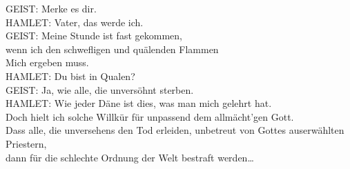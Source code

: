 {\begin{playdialog}
GEIST: Merke es dir.\\

HAMLET: Vater, das werde ich.\\

GEIST: Meine Stunde ist fast gekommen,\\
wenn ich den schwefligen und quälenden Flammen\\
Mich ergeben muss.\\

HAMLET: Du bist in Qualen?\\

GEIST: Ja, wie alle, die unversöhnt sterben.\\


HAMLET: Wie jeder Däne ist dies, was man mich gelehrt hat.\\
Doch hielt ich solche Willkür für unpassend dem allmächt'gen Gott.\\
Dass alle, die unversehens den Tod erleiden, unbetreut von Gottes auserwählten Priestern,\\
dann für die schlechte Ordnung der Welt bestraft werden…\\


\end{playdialog}}
